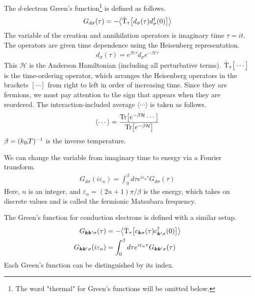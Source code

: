 \documentclass[a4j]{jarticle}
\begin{document}
The $d$-electron Green's function\footnote{The word "thermal" for Green's functions will be omitted below.} is defined as follows.
\begin{align}
	G_{d \sigma}(\tau)
	=
	-
	\big\langle
	{\rm \hat{T}}_{\tau}
	\big[
		d_{\sigma}(\tau)
		d_{\sigma}^{\dagger}(0)
		\big]
	\big\rangle
\end{align}
The variable of the creation and annihilation operators is imaginary time $\tau=it$.
The operators are given time dependence using the Heisenberg representation.
\begin{align}
	d_{\sigma}(\tau)
	=
	e^{\mathcal{H}\tau}
	d_{\sigma}
	e^{-\mathcal{H}\tau}
\end{align}
This $\mathcal{H}$ is the Anderson Hamiltonian (including all perturbative terms).
$
	{\rm \hat{T}}_{\tau}
	\big[
		\cdots
		\big]
$
is the time-ordering operator, which arranges the Heisenberg operators in the brackets $[\cdots]$ from right to left in order of increasing time.
Since they are fermions, we must pay attention to the sign that appears when they are reordered.
The interaction-included average $\langle \cdots \rangle$ is taken as follows.
\begin{align}
	\langle \cdots \rangle
	=
	\frac{
		{\rm Tr} \big[ e^{- \beta \mathcal{H}} \cdots \big]
	}{
		{\rm Tr} \big[ e^{- \beta \mathcal{H}} \big]
	}
	\label{eqn:12ave}
\end{align}
$\beta=(k_{\rm B}T)^{-1}$ is the inverse temperature.

We can change the variable from imaginary time to energy via a Fourier transform.
\begin{align}
	G_{d \sigma}(i \varepsilon_{n})
	=
	\int^{\beta}_{0}
	d\tau
	e^{i \varepsilon_{n} \tau}
	G_{d \sigma}(\tau)
\end{align}
Here, $n$ is an integer, and $\varepsilon_{n}=(2n+1)\pi/\beta$ is the energy, which takes on discrete values and is called the fermionic Matsubara frequency.

The Green's function for conduction electrons is defined with a similar setup.
\begin{align}
	G_{\bm{k}\bm{k}' \sigma}(\tau)
	 & =
	-
	\big\langle
	{\rm \hat{T}}_{\tau}
	\big[
		c_{\bm{k} \sigma}(\tau)
		c_{\bm{k}' \sigma}^{\dagger}(0)
		\big]
	\big\rangle
	\\
	G_{\bm{k}\bm{k}' \sigma}(i \varepsilon_{n})
	 & =
	\int^{\beta}_{0}
	d\tau
	e^{i \varepsilon_{n} \tau}
	G_{\bm{k}\bm{k}' \sigma}(\tau)
\end{align}
Each Green's function can be distinguished by its index.
\end{document}

